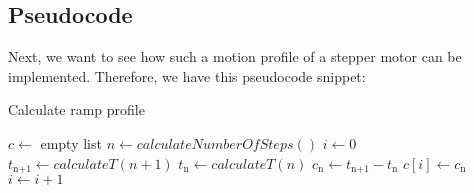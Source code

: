 \documentclass[hidelinks, 11pt, fleqn]{article}   	%
\begin{document}
\subsection{Pseudocode}
Next, we want to see how such a motion profile of a stepper motor can be implemented. Therefore, we have this pseudocode snippet:
\begin{algorithm}
	\caption{Calculate ramp profile}
	\begin{algorithmic}[1]
		\State $c\gets$ empty list
		\State $n \gets calculateNumberOfSteps()$
		\State $i \gets 0$
			\State $t_\text{n+1} \gets calculateT(n+1)$
			\State $t_\text{n} \gets calculateT(n)$
			\State $c_\text{n} \gets t_\text{n+1} - t_\text{n}$
			\State $c[i]\gets c_\text{n}$
			\State $i \gets i + 1$
		\EndWhile
	\end{algorithmic}
\end{algorithm}
\end{document}
